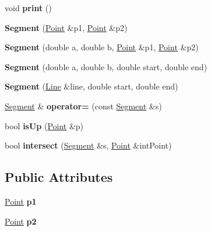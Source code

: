 \begin{DoxyCompactItemize}
\item 
\hypertarget{classSegment_a1eaf93a45513f8ba55ae6e59567bbbf5}{void {\bfseries print} ()}\label{classSegment_a1eaf93a45513f8ba55ae6e59567bbbf5}

\item 
\hypertarget{classSegment_ad0e5c8d754ce5a75481cfc7f219c0e89}{{\bfseries Segment} (\hyperlink{structPoint}{Point} \&p1, \hyperlink{structPoint}{Point} \&p2)}\label{classSegment_ad0e5c8d754ce5a75481cfc7f219c0e89}

\item 
\hypertarget{classSegment_aaccb675d9d27369adc8c43cba7b4ca30}{{\bfseries Segment} (double a, double b, \hyperlink{structPoint}{Point} \&p1, \hyperlink{structPoint}{Point} \&p2)}\label{classSegment_aaccb675d9d27369adc8c43cba7b4ca30}

\item 
\hypertarget{classSegment_a3bd6adc6bdf33075f6bdfa0531af2ef0}{{\bfseries Segment} (double a, double b, double start, double end)}\label{classSegment_a3bd6adc6bdf33075f6bdfa0531af2ef0}

\item 
\hypertarget{classSegment_a615337a1fad34f28e0c2b23e40c18521}{{\bfseries Segment} (\hyperlink{classLine}{Line} \&line, double start, double end)}\label{classSegment_a615337a1fad34f28e0c2b23e40c18521}

\item 
\hypertarget{classSegment_aaa84ef4ab376f6668573696a129c547b}{\hyperlink{classSegment}{Segment} \& {\bfseries operator=} (const \hyperlink{classSegment}{Segment} \&s)}\label{classSegment_aaa84ef4ab376f6668573696a129c547b}

\item 
\hypertarget{classSegment_a105101551a17e1eeaea3a60382c32d99}{bool {\bfseries is\-Up} (\hyperlink{structPoint}{Point} \&p)}\label{classSegment_a105101551a17e1eeaea3a60382c32d99}

\item 
\hypertarget{classSegment_a1da058c85124d8155e5542ece5ed7265}{bool {\bfseries intersect} (\hyperlink{classSegment}{Segment} \&s, \hyperlink{structPoint}{Point} \&int\-Point)}\label{classSegment_a1da058c85124d8155e5542ece5ed7265}

\end{DoxyCompactItemize}
\subsection*{Public Attributes}
\begin{DoxyCompactItemize}
\item 
\hypertarget{classSegment_a66dff1645946cc87157a0cbd6d8b23f3}{\hyperlink{structPoint}{Point} {\bfseries p1}}\label{classSegment_a66dff1645946cc87157a0cbd6d8b23f3}

\item 
\hypertarget{classSegment_a9c1f3b8369daf27f3b809cc048f1354f}{\hyperlink{structPoint}{Point} {\bfseries p2}}\label{classSegment_a9c1f3b8369daf27f3b809cc048f1354f}

\end{DoxyCompactItemize}


